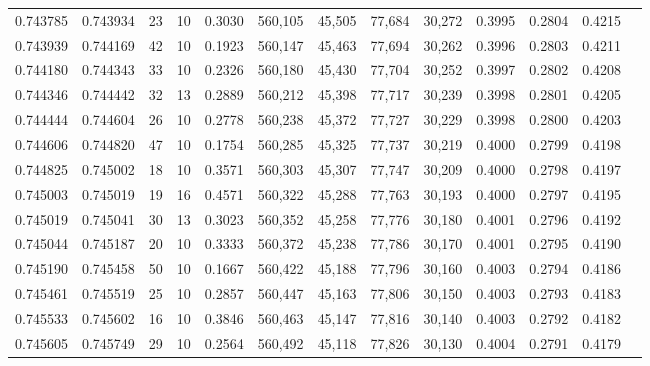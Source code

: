 \begin{tabular}{rrrrrrrrrrrrr}
0.743785 & 0.743934 &    23 &  10 &                                     0.3030 & 560,105 &  45,505 &  77,684 &  30,272 & 0.3995 & 0.2804 & 0.4215 \\
0.743939 & 0.744169 &    42 &  10 &                                     0.1923 & 560,147 &  45,463 &  77,694 &  30,262 & 0.3996 & 0.2803 & 0.4211 \\
0.744180 & 0.744343 &    33 &  10 &                                     0.2326 & 560,180 &  45,430 &  77,704 &  30,252 & 0.3997 & 0.2802 & 0.4208 \\
0.744346 & 0.744442 &    32 &  13 &                                     0.2889 & 560,212 &  45,398 &  77,717 &  30,239 & 0.3998 & 0.2801 & 0.4205 \\
0.744444 & 0.744604 &    26 &  10 &                                     0.2778 & 560,238 &  45,372 &  77,727 &  30,229 & 0.3998 & 0.2800 & 0.4203 \\
0.744606 & 0.744820 &    47 &  10 &                                     0.1754 & 560,285 &  45,325 &  77,737 &  30,219 & 0.4000 & 0.2799 & 0.4198 \\
0.744825 & 0.745002 &    18 &  10 &                                     0.3571 & 560,303 &  45,307 &  77,747 &  30,209 & 0.4000 & 0.2798 & 0.4197 \\
0.745003 & 0.745019 &    19 &  16 &                                     0.4571 & 560,322 &  45,288 &  77,763 &  30,193 & 0.4000 & 0.2797 & 0.4195 \\
0.745019 & 0.745041 &    30 &  13 &                                     0.3023 & 560,352 &  45,258 &  77,776 &  30,180 & 0.4001 & 0.2796 & 0.4192 \\
0.745044 & 0.745187 &    20 &  10 &                                     0.3333 & 560,372 &  45,238 &  77,786 &  30,170 & 0.4001 & 0.2795 & 0.4190 \\
0.745190 & 0.745458 &    50 &  10 &                                     0.1667 & 560,422 &  45,188 &  77,796 &  30,160 & 0.4003 & 0.2794 & 0.4186 \\
0.745461 & 0.745519 &    25 &  10 &                                     0.2857 & 560,447 &  45,163 &  77,806 &  30,150 & 0.4003 & 0.2793 & 0.4183 \\
0.745533 & 0.745602 &    16 &  10 &                                     0.3846 & 560,463 &  45,147 &  77,816 &  30,140 & 0.4003 & 0.2792 & 0.4182 \\
0.745605 & 0.745749 &    29 &  10 &                                     0.2564 & 560,492 &  45,118 &  77,826 &  30,130 & 0.4004 & 0.2791 & 0.4179 \\

\end{tabular}
